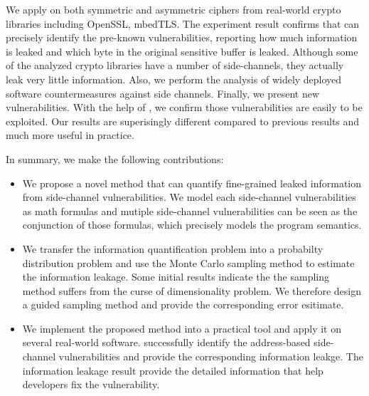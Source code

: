 We apply \tool{} on both symmetric and asymmetric ciphers from real-world crypto libraries including OpenSSL,
mbedTLS. The experiment result confirms that \tool{} can precisely identify the pre-known vulnerabilities,
reporting how much information is leaked and which byte in the original sensitive buffer is leaked. 
Although some of the analyzed crypto libraries have a number of side-channels, they actually
leak very little information. Also, we perform the analysis of widely deployed software countermeasures
against side channels.
Finally, we present new vulnerabilities. With the help of \tool{}, we confirm those
vulnerabilities are easily to be exploited. Our results are superisingly different compared to previous results
and much more useful in practice.

In summary, we make the following contributions:

\begin{itemize}
	\item We propose a novel method that can quantify fine-grained leaked information from side-channel
        vulnerabilities. We model each side-channel vulnerabilities as math formulas and 
        mutiple side-channel vulnerabilities can be seen as the conjunction of those formulas, which
        precisely models the program semantics.
        \item We transfer the information quantification problem into a probabilty distribution problem and 
        use the Monte Carlo sampling method to estimate the information leakage. Some initial results indicate the 
        the sampling method suffers from the curse of dimensionality problem. We therefore design a guided
        sampling method and provide the corresponding error esitimate.
	\item We implement the proposed method into a practical tool and apply it on several real-world software. \tool{} 
        successfully identify the address-based side-channel vulnerabilities and provide the corresponding
        information leakge. The information leakage result provide the detailed information that help developers
        fix the vulnerability.
\end{itemize}



